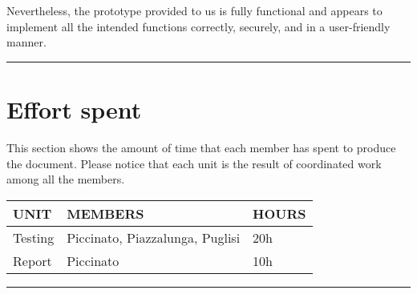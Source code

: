 \documentclass{Configuration_Files/Template}
\begin{document}
Nevertheless, the prototype provided to us is fully functional and appears to implement all the intended functions correctly, securely, and in a user-friendly manner.

{\color{bluepoli}\rule{\linewidth}{0.1pt}}

\chapter{Effort spent}

This section shows the amount of time that each member has spent to produce the document. Please notice that each unit is the result of coordinated work among all the members.

\begin{table}[h]
\centering
\begin{tabularx}{\textwidth}{| X | X | X |}
\hline
\textbf{UNIT} & \textbf{MEMBERS} & \textbf{HOURS} \\ [1ex]
\hline
Testing & Piccinato, Piazzalunga, Puglisi & 20h \\ [1ex]
\hline
Report & Piccinato & 10h \\ [1ex]
\hline
\end{tabularx}
\end{table}

{\color{bluepoli}\rule{\linewidth}{0.1pt}}
\end{document}

